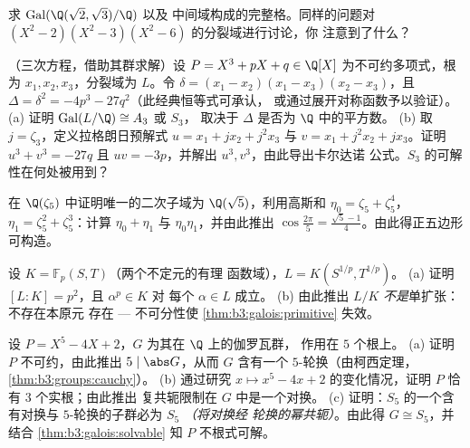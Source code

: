 \begin{exercise}[$\star\star$]\label{exo:b3:galois:7}
求 $\operatorname{Gal}(\Q(\sqrt2,\sqrt3)/\Q)$ 以及
中间域构成的完整格。同样的问题对
$(X^2-2)(X^2-3)(X^2-6)$ 的分裂域进行讨论，你
注意到了什么？
\end{exercise}

\begin{exercise}[$\star\star$]\label{exo:b3:galois:8}
（三次方程，借助其群求解）设 $P = X^3 + pX + q \in
\Q[X]$ 为不可约多项式，根为 $x_1, x_2, x_3$，分裂域为
$L$。令 $\delta = (x_1 - x_2)(x_1 - x_3)(x_2 - x_3)$，且
$\Delta = \delta^2 = -4p^3 - 27q^2$（此经典恒等式可承认，
或通过展开对称函数予以验证）。
(a) 证明 $\operatorname{Gal}(L/\Q) \cong A_3$ 或 $S_3$，
取决于 $\Delta$ 是否为 $\Q$ 中的平方数。
(b) 取 $j = \zeta_3$，定义拉格朗日预解式 $u = x_1
+ jx_2 + j^2x_3$ 与 $v = x_1 + j^2x_2 + jx_3$。证明 $u^3 + v^3
= -27q$ 且 $uv = -3p$，并解出 $u^3, v^3$，由此导出卡尔达诺
公式。$S_3$ 的可解性在何处被用到？
\end{exercise}

\begin{exercise}[$\star\star$]\label{exo:b3:galois:9}
在 $\Q(\zeta_5)$ 中证明唯一的二次子域为
$\Q(\sqrt5)$，利用高斯和 $\eta_0 = \zeta_5 + \zeta_5^4$，
$\eta_1 = \zeta_5^2 + \zeta_5^3$：计算 $\eta_0 + \eta_1$ 与
$\eta_0\eta_1$，并由此推出 $\cos\frac{2\pi}5 = \frac{\sqrt5 -
1}4$。由此得正五边形可构造。
\end{exercise}

\begin{exercise}[$\star\star\star$]\label{exo:b3:galois:10}
设 $K = \mathbb F_p(S, T)$（两个不定元的有理
函数域），$L = K(S^{1/p}, T^{1/p})$。
(a) 证明 $[L:K] = p^2$，且 $\alpha^p \in K$ 对
每个 $\alpha \in L$ 成立。
(b) 由此推出 $L/K$ \emph{不是}单扩张：不存在本原元
存在 --- 不可分性使
\cref{thm:b3:galois:primitive} 失效。
\end{exercise}

\begin{exercise}[$\star\star\star$]\label{exo:b3:galois:11}
设 $P = X^5 - 4X + 2$，$G$ 为其在 $\Q$ 上的伽罗瓦群，
作用在 $5$ 个根上。
(a) 证明 $P$ 不可约，由此推出 $5 \mid \abs G$，从而
$G$ 含有一个 $5$-轮换（由柯西定理，
\cref{thm:b3:groups:cauchy}）。
(b) 通过研究 $x \mapsto x^5 - 4x +
2$ 的变化情况，证明 $P$ 恰有 $3$ 个实根；由此推出
复共轭限制在 $G$ 中是一个对换。
(c) 证明：$S_5$ 的一个含有对换与
$5$-轮换的子群必为 $S_5$ \emph{（将对换经
轮换的幂共轭）}。由此得 $G \cong S_5$，并结合
\cref{thm:b3:galois:solvable} 知
$P$ 不根式可解。
\end{exercise}


